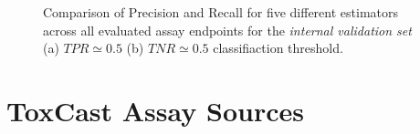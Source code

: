 \begin{figure}
\begin{subfigure}[b]{0.48\textwidth}
    \caption{}
    \label{fig:hitcall_classification_Feature_Selection_XGBClassifier_val_tnr_macro_avg}
\end{subfigure}
\caption{Comparison of Precision and Recall for five different estimators across all evaluated assay endpoints for the \emph{internal validation set} (a) $TPR \simeq 0.5$ (b) $TNR \simeq 0.5$ classifiaction threshold.}
\label{fig:hitcall_classification_Feature_Selection_XGBClassifier_val_default_optimal_macro_avg}
\end{figure}







\section{ToxCast Assay Sources}\label{sec:assay_source_names}

